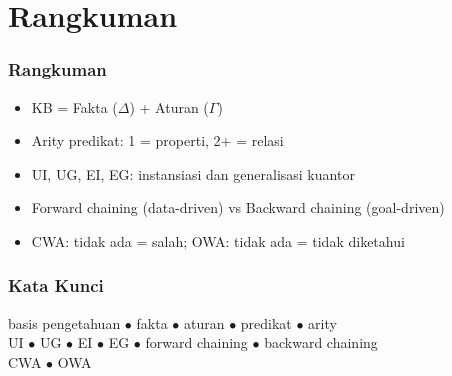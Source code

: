 \documentclass[handout]{beamer}
\theoremstyle{definition}
\theoremstyle{example}
\begin{document}
\section{Rangkuman}

\begin{frame}
\frametitle{Rangkuman}
\begin{itemize}
  \item KB = Fakta ($\Delta$) + Aturan ($\Gamma$)
  \item Arity predikat: 1 = properti, 2+ = relasi
  \item UI, UG, EI, EG: instansiasi dan generalisasi kuantor
  \item Forward chaining (data-driven) vs Backward chaining (goal-driven)
  \item CWA: tidak ada = salah; OWA: tidak ada = tidak diketahui
\end{itemize}
\end{frame}

\begin{frame}
\frametitle{Kata Kunci}
\begin{center}
\small
basis pengetahuan $\bullet$ fakta $\bullet$ aturan $\bullet$ predikat $\bullet$ arity\\
UI $\bullet$ UG $\bullet$ EI $\bullet$ EG $\bullet$ forward chaining $\bullet$ backward chaining\\
CWA $\bullet$ OWA
\end{center}
\end{frame}
\end{document}
